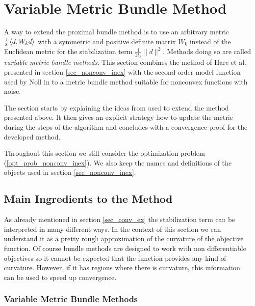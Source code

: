 \section{Variable Metric Bundle Method}
\label{sec_variable_metric}


A way to extend the proximal bundle method is to use an arbitrary metric \(\frac{1}{2}\left\langle d,W_kd \right\rangle\) with a symmetric and positive definite matrix \(W_k\) instead of the Euclidean metric for the stabilization term \(\frac{1}{2t_k}\|d\|^2\). Methods doing so are called \emph{variable metric bundle methods}.
This section combines the method of Hare et al. presented in section \ref{sec_nonconv_inex} with the second order model function used by Noll in \cite{Noll2013} to a metric bundle method suitable for nonconvex functions with noise.

The section starts by explaining the ideas from \cite{Noll2013} used to extend the method presented above. It then gives an explicit strategy how to update the metric during the steps of the algorithm and concludes with a convergence proof for the developed method.

Throughout this section we still consider the optimization problem (\ref{opt_prob_nonconv_inex}). We also keep the names and definitions of the objects used in section \ref{sec_nonconv_inex}.

\subsection{Main Ingredients to the Method}

As already mentioned in section \ref{sec_conv_ex} the stabilization term can be interpreted in many different ways. In the context of this section we can understand it as a pretty rough approximation of the curvature of the objective function.
Of course bundle methods are designed to work with non differentiable objectives so it cannot be expected that the function provides any kind of curvature. However, if it has regions where there is curvature, this information can be used to speed up convergence.

\subsubsection{Variable Metric Bundle Methods}

